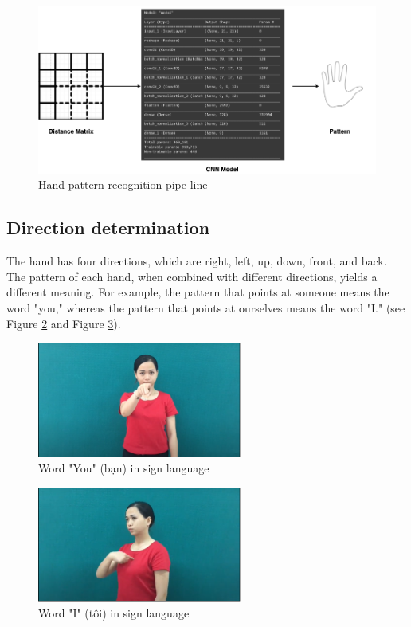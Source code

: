 \begin{figure}[H]
	\centering
	\includegraphics[width=\textwidth]{img/Chap4/Hand-Pattern-Reg-Model.png}
	\caption{Hand pattern recognition pipe line}
	\label{fig:Chap4-StructureOfConvolutionalNeuralNetwork}
\end{figure}

\subsection{Direction determination}

The hand has four directions, which are right, left, up, down, front, and back. The pattern of each hand, when combined with different directions, yields a different meaning. For example, the pattern that points at someone means the word "you," whereas the pattern that points at ourselves means the word "I." (see Figure \ref{fig:Chap4-WordYouInSignLanguage} and Figure \ref{fig:Chap4-WordIInSignLanguage}).

\begin{figure}[H]
	\centering
	\includegraphics[width=0.6\textwidth]{img/Chap4/WordYouInSignLanguage.png}
	\caption{Word "You" (bạn) in sign language}
	\label{fig:Chap4-WordYouInSignLanguage}
\end{figure}

\begin{figure}[H]
	\centering
	\includegraphics[width=0.6\textwidth]{img/Chap4/WordIInSignLanguage.png}
	\caption{Word "I" (tôi) in sign language}
	\label{fig:Chap4-WordIInSignLanguage}
\end{figure}

